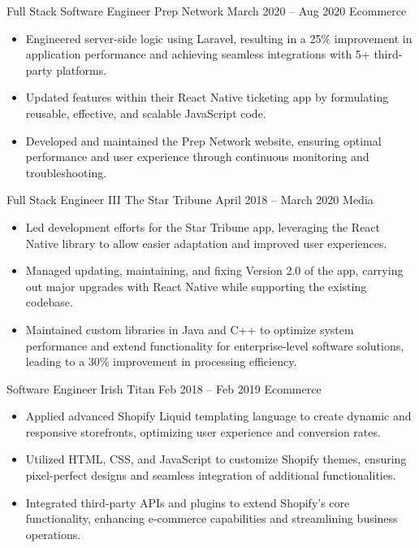 \medskip

\cvexperience
{Full Stack Software Engineer}
{Prep Network}
{March 2020 – Aug 2020}
{Ecommerce}
{\footnotesize\faCode \hspace{1pt}       }
\begin{itemize}
    \item Engineered server-side logic using Laravel, resulting in a 25\% improvement in application performance and achieving seamless integrations with 5+ third-party platforms.
    \item Updated features within their React Native ticketing app by formulating reusable, effective, and scalable JavaScript code.
    \item Developed and maintained the Prep Network website, ensuring optimal performance and user experience through continuous monitoring and troubleshooting.
\end{itemize}
\medskip
\cvexperience
{Full Stack Engineer III}
{The Star Tribune}
{April 2018 – March 2020}
{Media}
{\footnotesize\faCode \hspace{1pt}       }
\begin{itemize}
    \item Led development efforts for the Star Tribune app, leveraging the React Native library to allow easier adaptation and improved user experiences.
    \item Managed updating, maintaining, and fixing Version 2.0 of the app, carrying out major upgrades with React Native while supporting the existing codebase.
    \item Maintained custom libraries in Java and C++ to optimize system performance and extend functionality for enterprise-level software solutions, leading to a 30\% improvement in processing efficiency.
\end{itemize}

\medskip

\cvexperience
{Software Engineer}
{Irish Titan}
{Feb 2018 – Feb 2019}
{Ecommerce}
{\footnotesize\faCode \hspace{.5pt}       }
\begin{itemize}
    \item Applied advanced Shopify Liquid templating language to create dynamic and responsive storefronts, optimizing user experience and conversion rates.
    \item Utilized HTML, CSS, and JavaScript to customize Shopify themes, ensuring pixel-perfect designs and seamless integration of additional functionalities.
    \item Integrated third-party APIs and plugins to extend Shopify's core functionality, enhancing e-commerce capabilities and streamlining business operations.
\end{itemize}

